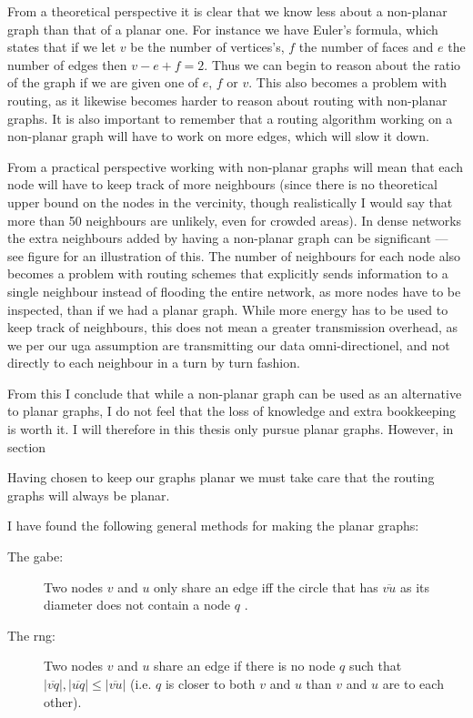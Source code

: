 From a theoretical perspective it is clear that we know less about a non-planar graph than that of a planar one. For instance we have Euler's formula, which states that if we let $v$ be the number of vertices's, $f$ the number of faces and $e$ the number of edges then $v - e + f = 2$. Thus we can begin to reason about the ratio of the graph if we are given one of $e$, $f$ or $v$. This also becomes a problem with routing, as it likewise becomes harder to reason about routing with non-planar graphs. It is also important to remember that a routing algorithm working on a non-planar graph will have to work on more edges, which will slow it down.

From a practical perspective working with non-planar graphs will mean that each node will have to keep track of more neighbours (since there is no theoretical upper bound on the nodes in the vercinity, though realistically I would say that more than 50 neighbours are unlikely, even for crowded areas). In dense networks the extra neighbours added by having a non-planar graph can be significant --- see figure  for an illustration of this. The number of neighbours for each node also becomes a problem with routing schemes that explicitly sends information to a single neighbour instead of flooding the entire network, as more nodes have to be inspected, than if we had a planar graph. While more energy has to be used to keep track of neighbours, this does not mean a greater transmission overhead, as we per our \ac{uga} assumption are transmitting our data omni-directionel, and not directly to each neighbour in a turn by turn fashion.

From this I conclude that while a non-planar graph can be used as an alternative to planar graphs, I do not feel that the loss of knowledge and extra bookkeeping is worth it. I will therefore in this thesis only pursue planar graphs. However, in section
 
Having chosen to keep our graphs planar we must take care that the routing graphs will always be planar.

I have found the following general methods for making the planar graphs:
\begin{description}
\item[The \ac{gabe}:] Two nodes $v$ and $u$ only share an edge iff the circle that has $\overline{vu}$ as its diameter does not contain a node $q$ \cite{gopher, gpsr}. 
\item[The \ac{rng}:] Two nodes $v$ and $u$ share an edge if there is no node $q$ such that $|\overline{vq}|, |\overline{uq}| \leq |\overline{vu}|$ (i.e. $q$ is closer to both $v$ and $u$ than $v$ and $u$ are to each other). \cite{gpsr, RNG}
\end{description}

